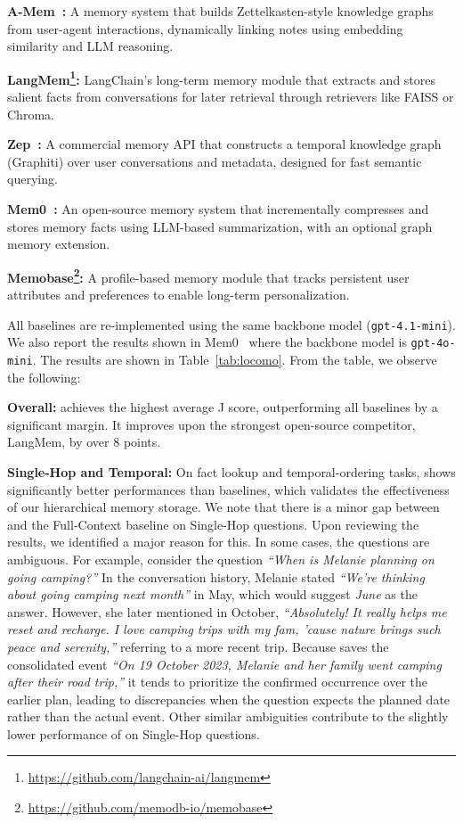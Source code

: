 \textbf{A-Mem~\citep{amem}:} A memory system that builds Zettelkasten-style knowledge graphs from user-agent interactions, dynamically linking notes using embedding similarity and LLM reasoning.

\textbf{LangMem\footnote{\url{https://github.com/langchain-ai/langmem}}:} LangChain’s long-term memory module that extracts and stores salient facts from conversations for later retrieval through retrievers like FAISS or Chroma.

\textbf{Zep~\citep{zep}:} A commercial memory API that constructs a temporal knowledge graph (Graphiti) over user conversations and metadata, designed for fast semantic querying.

\textbf{Mem0~\citep{mem0}:} An open-source memory system that incrementally compresses and stores memory facts using LLM-based summarization, with an optional graph memory extension.

\textbf{Memobase\footnote{\url{https://github.com/memodb-io/memobase}}:} A profile-based memory module that tracks persistent user attributes and preferences to enable long-term personalization.

All baselines are re-implemented using the same backbone model (\texttt{gpt-4.1-mini}). We also report the results shown in Mem0~\citep{mem0} where the backbone model is \texttt{gpt-4o-mini}. The results are shown in Table~\ref{tab:locomo}. From the table, we observe the following:

\textbf{Overall:} \ours achieves the highest average J score, outperforming all baselines by a significant margin. It improves upon the strongest open-source competitor, LangMem, by over 8 points.

\textbf{Single-Hop and Temporal:} On fact lookup and temporal-ordering tasks, \ours shows significantly better performances than baselines, which validates the effectiveness of our hierarchical memory storage. 
We note that there is a minor gap between \ours and the Full-Context baseline on Single-Hop questions. Upon reviewing the results, we identified a major reason for this. In some cases, the questions are ambiguous. For example, consider the question \emph{``When is Melanie planning on going camping?''} In the conversation history, Melanie stated \emph{``We’re thinking about going camping next month''} in May, which would suggest \emph{June} as the answer. However, she later mentioned in October, \emph{``Absolutely! It really helps me reset and recharge. I love camping trips with my fam, ’cause nature brings such peace and serenity,''} referring to a more recent trip. Because \ours saves the consolidated event \emph{``On 19 October 2023, Melanie and her family went camping after their road trip,''} it tends to prioritize the confirmed occurrence over the earlier plan, leading to discrepancies when the question expects the planned date rather than the actual event. Other similar ambiguities contribute to the slightly lower performance of \ours on Single-Hop questions.


